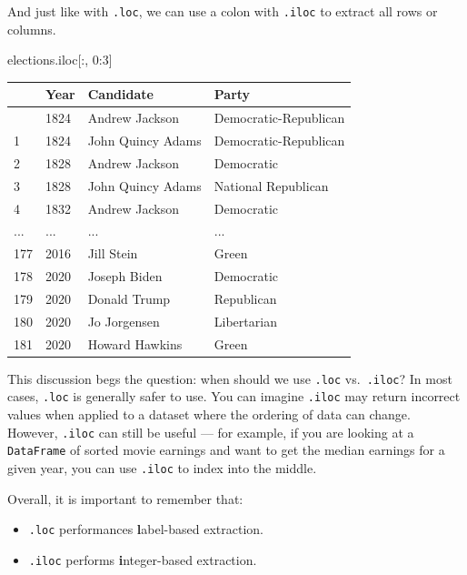 \documentclass[
  letterpaper,
  DIV=11,
  numbers=noendperiod]{scrreprt}
\newenvironment{Shaded}{\begin{snugshade}}{\end{snugshade}}
\newcommand{\DecValTok}[1]{\textcolor[rgb]{0.68,0.00,0.00}{#1}}
\newcommand{\NormalTok}[1]{\textcolor[rgb]{0.00,0.23,0.31}{#1}}
\providecommand{\tightlist}{%
  \setlength{\itemsep}{0pt}\setlength{\parskip}{0pt}}\usepackage{longtable,booktabs,array}
\begin{document}
And just like with \texttt{.loc}, we can use a colon with \texttt{.iloc}
to extract all rows or columns.

\begin{Shaded}
\begin{Highlighting}[]
\NormalTok{elections.iloc[:, }\DecValTok{0}\NormalTok{:}\DecValTok{3}\NormalTok{]}
\end{Highlighting}
\end{Shaded}

\begin{longtable}[]{@{}llll@{}}
\toprule\noalign{}
& Year & Candidate & Party \\
\midrule\noalign{}
\endhead
\bottomrule\noalign{}
\endlastfoot
0 & 1824 & Andrew Jackson & Democratic-Republican \\
1 & 1824 & John Quincy Adams & Democratic-Republican \\
2 & 1828 & Andrew Jackson & Democratic \\
3 & 1828 & John Quincy Adams & National Republican \\
4 & 1832 & Andrew Jackson & Democratic \\
... & ... & ... & ... \\
177 & 2016 & Jill Stein & Green \\
178 & 2020 & Joseph Biden & Democratic \\
179 & 2020 & Donald Trump & Republican \\
180 & 2020 & Jo Jorgensen & Libertarian \\
181 & 2020 & Howard Hawkins & Green \\
\end{longtable}

This discussion begs the question: when should we use \texttt{.loc}
vs.~\texttt{.iloc}? In most cases, \texttt{.loc} is generally safer to
use. You can imagine \texttt{.iloc} may return incorrect values when
applied to a dataset where the ordering of data can change. However,
\texttt{.iloc} can still be useful --- for example, if you are looking
at a \texttt{DataFrame} of sorted movie earnings and want to get the
median earnings for a given year, you can use \texttt{.iloc} to index
into the middle.

Overall, it is important to remember that:

\begin{itemize}
\tightlist
\item
  \texttt{.loc} performances \textbf{l}abel-based extraction.
\item
  \texttt{.iloc} performs \textbf{i}nteger-based extraction.
\end{itemize}
\end{document}
